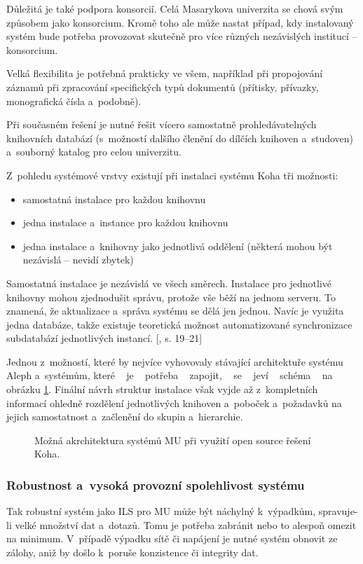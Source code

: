 \documentclass[
	11pt, oneside, printed, final, palatino
	microtype,
	table,   %
	lof,     %
	lot     %
]{fithesis3}
\newcommand{\citepages}[2]{[\cite{#2}, s. #1]}
\begin{document}
{Důležitá je také podpora konsorcií. Celá Masarykova univerzita se chová svým způsobem jako konsorcium. Kromě toho ale může nastat případ, kdy instalovaný systém bude potřeba provozovat skutečně pro více různých nezávislých institucí – konsorcium.

Velká flexibilita je potřebná prakticky ve všem, například při propojování záznamů při zpracování specifických typů dokumentů (přítisky, přívazky, monografická čísla a~podobně).

Při současném řešení je nutné řešit vícero samostatně prohledávatelných knihovních databází (s~možností dalšího členění do dílčích knihoven a~studoven) a~souborný katalog pro celou univerzitu.

Z~pohledu systémové vrstvy existují při instalaci systému Koha tři možnosti:

\begin{itemize}
\item samostatná instalace pro každou knihovnu
\item jedna instalace a~instance pro každou knihovnu
\item jedna instalace a~knihovny jako jednotlivá oddělení (některá mohou být nezávislá – nevidí zbytek)
\end{itemize}

Samostatná instalace je nezávislá ve všech směrech.
Instalace pro jednotlivé knihovny mohou zjednodušit správu, protože vše běží na jednom serveru. To znamená, že aktualizace a~správa systému se dělá jen jednou. Navíc je využita jedna databáze, takže existuje teoretická možnost automatizované synchronizace subdatabází jednotlivých instancí. \citepages{19–21}{breeding_2012}

Jednou z~možností, které by nejvíce vyhovovaly stávající architektuře systému Aleph a~systémům, které ~ je ~ potřeba ~ zapojit, ~ se ~ jeví ~ schéma ~ na obrázku \ref{fig:koha}. Finální návrh struktur instalace však vyjde až z~kompletních informací ohledně rozdělení jednotlivých knihoven a~poboček a~požadavků na jejich samostatnost a~začlenění do skupin a~hierarchie.

\begin{figure}
    \centering
	\def\svgwidth{1.27\textwidth}
    
	\caption{Možná akrchitektura systémů MU při využití open source řešení Koha.}
	\label{fig:koha}
\end{figure}

\subsubsection{{\large Robustnost a~vysoká provozní spolehlivost systému}}
Tak robustní systém jako ILS pro MU může být náchylný k~výpadkům, spravuje-li velké množství dat a~dotazů. Tomu je potřeba zabránit nebo to alespoň omezit na minimum. V~případě výpadku sítě či napájení je nutné systém obnovit ze zálohy, aniž by došlo k~poruše konzistence či integrity dat.

}
\end{document}
